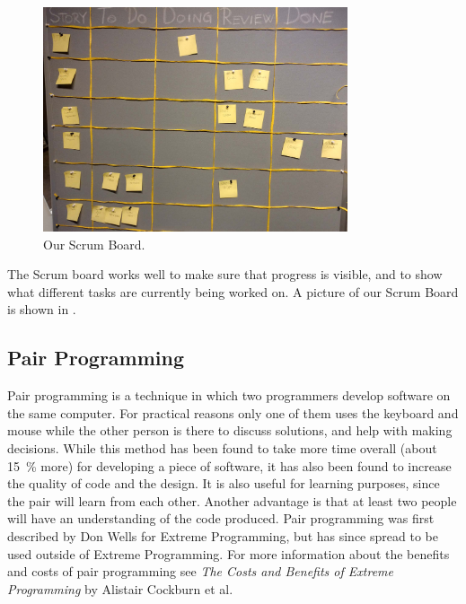 \begin{description}
	\begin{figure}
	  \begin{center}
	    \includegraphics[width=0.80\textwidth]{figures/img/scrumboard_compressed.jpg}
	  \end{center}
	  \caption{Our Scrum Board.}
	  \label{fig:scrumboard}
	\end{figure}
	The Scrum board works well to make sure that progress is visible, and to show what different tasks are currently being worked on.
	A picture of our Scrum Board is shown in .
\end{description}

\subsection{Pair Programming}\label{subsubsec:pairprogramming}
Pair programming is a technique in which two programmers develop software on the same computer.
For practical reasons only one of them uses the keyboard and mouse while the other person is there to discuss solutions, and help with making decisions.
While this method has been found to take more time overall (about 15~\% more) for developing a piece of software, it has also been found to increase the quality of code and the design.
It is also useful for learning purposes, since the pair will learn from each other.
Another advantage is that at least two people will have an understanding of the code produced.
Pair programming was first described by Don Wells for Extreme Programming\cite{pairAgile}, but has since spread to be used outside of Extreme Programming.
For more information about the benefits and costs of pair programming see \textit{The Costs and Benefits of Extreme Programming}\cite{cockburn2000costs} by Alistair Cockburn et al.


